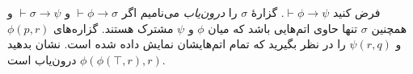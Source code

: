 فرض کنید
$\vdash\phi\to\psi$.
گزارهٔ
$\sigma$
را
\emph{درون‌یاب}
می‌نامیم اگر
$\vdash\phi\to\sigma$
و
$\vdash\sigma\to\psi$
و همچنین
$\sigma$
تنها حاوی اتم‌هایی باشد که میان
$\phi$
و
$\psi$
مشترک هستند.
گزاره‌های
$\phi(p,r)$
و
$\psi(r,q)$
را در نظر بگیرید که تمام اتم‌هایشان نمایش داده شده است. نشان بدهید
$\phi(\phi(\top,r),r)$
درون‌یاب است.